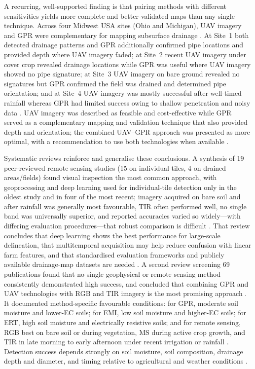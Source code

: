 A recurring, well-supported finding is that pairing methods with different sensitivities yields more complete and better-validated maps than any single technique. Across four Midwest USA sites (Ohio and Michigan), UAV imagery and GPR were complementary for mapping subsurface drainage \parencite{Koganti2021}. At Site~1 both detected drainage patterns and GPR additionally confirmed pipe locations and provided depth where UAV imagery faded; at Site~2 recent UAV imagery under cover crop revealed drainage locations while GPR was useful where UAV imagery showed no pipe signature; at Site~3 UAV imagery on bare ground revealed no signatures but GPR confirmed the field was drained and determined pipe orientation; and at Site~4 UAV imagery was mostly successful after well-timed rainfall whereas GPR had limited success owing to shallow penetration and noisy data \parencite{Koganti2021}. UAV imagery was described as feasible and cost-effective while GPR served as a complementary mapping and validation technique that also provided depth and orientation; the combined UAV--GPR approach was presented as more optimal, with a recommendation to use both technologies when available \parencite{Koganti2021}.

Systematic reviews reinforce and generalise these conclusions. A synthesis of 19 peer-reviewed remote sensing studies (15 on individual tiles, 4 on drained areas/fields) found visual inspection the most common approach, with geoprocessing and deep learning used for individual-tile detection only in the oldest study and in four of the most recent; imagery acquired on bare soil and after rainfall was generally most favourable, TIR often performed well, no single band was universally superior, and reported accuracies varied so widely---with differing evaluation procedures---that robust comparison is difficult \parencite{Carlsen2024}. That review concludes that deep learning shows the best performance for large-scale delineation, that multitemporal acquisition may help reduce confusion with linear farm features, and that standardised evaluation frameworks and publicly available drainage-map datasets are needed \parencite{Carlsen2024}. A second review screening 69 publications found that no single geophysical or remote sensing method consistently demonstrated high success, and concluded that combining GPR and UAV technologies with RGB and TIR imagery is the most promising approach \parencite{Wienken2024}. It documented method-specific favourable conditions: for GPR, moderate soil moisture and lower-EC soils; for EMI, low soil moisture and higher-EC soils; for ERT, high soil moisture and electrically resistive soils; and for remote sensing, RGB best on bare soil or during vegetation, MS during active crop growth, and TIR in late morning to early afternoon under recent irrigation or rainfall \parencite{Wienken2024}. Detection success depends strongly on soil moisture, soil composition, drainage depth and diameter, and timing relative to agricultural and weather conditions \parencite{Wienken2024}.

